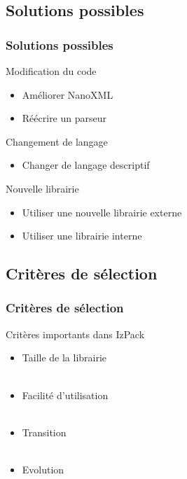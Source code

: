 \subsection{Solutions possibles}
\begin{frame}\frametitle{Solutions possibles}
\begin{minipage}[c]{.46\linewidth}
\begin{beamerboxesrounded}[shadow=true]{Modification du code}
\begin{itemize}
	\item Améliorer NanoXML
	\item Réécrire un parseur
\end{itemize}
\end{beamerboxesrounded}
\end{minipage}
\hfill
\begin{minipage}[c]{.46\linewidth}
\begin{beamerboxesrounded}[shadow=true]{Changement de langage}
\begin{itemize}
	\item Changer de langage descriptif
\end{itemize}
\end{beamerboxesrounded}
\end{minipage}
\vfill
\hfil
\begin{minipage}[c]{.8\linewidth}
\begin{beamerboxesrounded}[shadow=true]{Nouvelle librairie}
\begin{itemize}
	\item Utiliser une nouvelle librairie externe
	\item Utiliser une librairie interne
\end{itemize}
\end{beamerboxesrounded}
\end{minipage}
\end{frame}
\subsection{Critères de sélection}
\begin{frame}\frametitle{Critères de sélection}
\begin{beamerboxesrounded}[shadow=true]{Critères importants dans IzPack}
\begin{itemize}
	\item Taille de la librairie\\
	~\\
	\item Facilité d'utilisation\\
	~\\
	\item Transition\\
	~\\
	\item Evolution
\end{itemize}
\end{beamerboxesrounded}
\end{frame}
